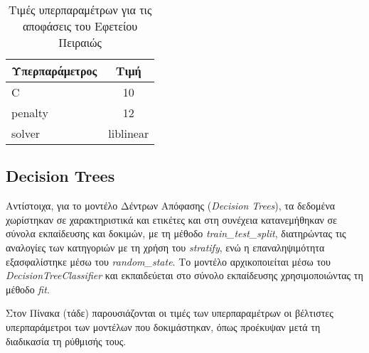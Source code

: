 \documentclass[diploma]{softlab-thesis}
\begin{document}
\begin{enumerate}
\begin{enumerate}
\begin{table}[h!]
\centering
\begin{tabular}{|l|c|}
\hline
\rowcolor[HTML]{FFFFFF} 
\textbf{Υπερπαράμετρος}      & \textbf{Τιμή}    \\ \hline
C           & 10 \\ \hline
penalty         & 12      \\ \hline
solver  & liblinear       \\ \hline
\end{tabular}
\caption{Τιμές υπερπαραμέτρων για τις αποφάσεις του Εφετείου Πειραιώς}
\end{table}



\subsection{Decision Trees}

Αντίστοιχα, για το μοντέλο Δέντρων 
Απόφασης (\textit{Decision Trees}), τα δεδομένα χωρίστηκαν σε χαρακτηριστικά και ετικέτες και στη συνέχεια κατανεμήθηκαν σε σύνολα εκπαίδευσης και δοκιμών, με τη μέθοδο \textit{train\_test\_split}, διατηρώντας τις αναλογίες των κατηγοριών με τη χρήση του \textit{stratify}, ενώ η επαναληψιμότητα εξασφαλίστηκε μέσω του \textit{random\_state}. Το μοντέλο αρχικοποιείται μέσω του \textit{DecisionTreeClassifier} και εκπαιδεύεται στο σύνολο εκπαίδευσης χρησιμοποιώντας τη μέθοδο \textit{fit}.

Στον Πίνακα (τάδε) παρουσιάζονται οι τιμές των υπερπαραμέτρων  οι βέλτιστες υπερπαράμετροι των μοντέλων που δοκιμάστηκαν, όπως προέκυψαν μετά τη διαδικασία τη ρύθμισής τους.



\end{enumerate}
\end{enumerate}
\end{document}
